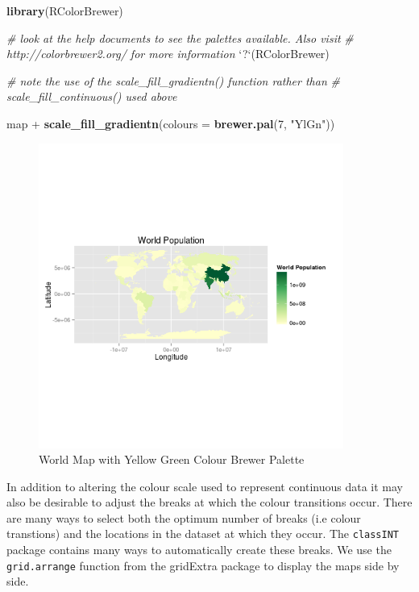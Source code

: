 \documentclass[]{article}
\newenvironment{Shaded}{}{}
\newcommand{\KeywordTok}[1]{\textcolor[rgb]{0.00,0.44,0.13}{\textbf{{#1}}}}
\newcommand{\DataTypeTok}[1]{\textcolor[rgb]{0.56,0.13,0.00}{{#1}}}
\newcommand{\DecValTok}[1]{\textcolor[rgb]{0.25,0.63,0.44}{{#1}}}
\newcommand{\StringTok}[1]{\textcolor[rgb]{0.25,0.44,0.63}{{#1}}}
\newcommand{\CommentTok}[1]{\textcolor[rgb]{0.38,0.63,0.69}{\textit{{#1}}}}
\newcommand{\NormalTok}[1]{{#1}}
\let\Oldincludegraphics\includegraphics
\renewcommand{\includegraphics}[1]{\Oldincludegraphics[width=10cm]{#1}}
\begin{document}
\begin{Shaded}
\begin{Highlighting}[]
\KeywordTok{library}\NormalTok{(RColorBrewer)}

\CommentTok{# look at the help documents to see the palettes available. Also visit}
\CommentTok{# http://colorbrewer2.org/ for more information}
\StringTok{`}\DataTypeTok{?}\StringTok{`}\NormalTok{(RColorBrewer)}

\CommentTok{# note the use of the scale_fill_gradientn() function rather than}
\CommentTok{# scale_fill_continuous() used above}

\NormalTok{map + }\KeywordTok{scale_fill_gradientn}\NormalTok{(}\DataTypeTok{colours =} \KeywordTok{brewer.pal}\NormalTok{(}\DecValTok{7}\NormalTok{, }\StringTok{"YlGn"}\NormalTok{))}
\end{Highlighting}
\end{Shaded}
\begin{figure}[htbp]
\centering
\includegraphics{figure/World_Map_with_Yellow_Green_Colour_Brewer_Palette.png}
\caption{World Map with Yellow Green Colour Brewer
Palette}
\end{figure}

In addition to altering the colour scale used to represent continuous
data it may also be desirable to adjust the breaks at which the colour
transitions occur. There are many ways to select both the optimum number
of breaks (i.e colour transtions) and the locations in the dataset at
which they occur. The \texttt{classINT} package contains many ways to
automatically create these breaks. We use the \texttt{grid.arrange}
function from the gridExtra package to display the maps side by side.
\end{document}
